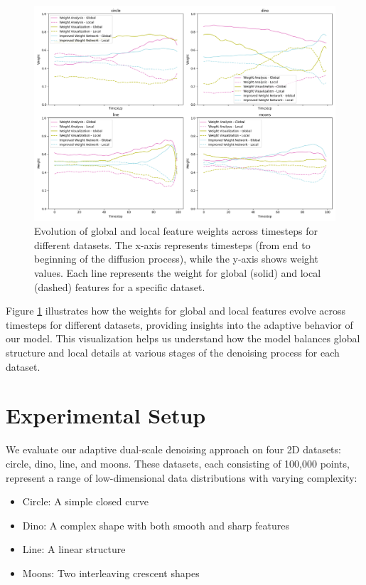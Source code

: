 \documentclass{article} %
\begin{document}
\begin{figure}[t]
    \centering
    \includegraphics[width=\textwidth]{weight_evolution.png}
    \caption{Evolution of global and local feature weights across timesteps for different datasets. The x-axis represents timesteps (from end to beginning of the diffusion process), while the y-axis shows weight values. Each line represents the weight for global (solid) and local (dashed) features for a specific dataset.}
    \label{fig:weight_evolution}
\end{figure}

Figure \ref{fig:weight_evolution} illustrates how the weights for global and local features evolve across timesteps for different datasets, providing insights into the adaptive behavior of our model. This visualization helps us understand how the model balances global structure and local details at various stages of the denoising process for each dataset.

\section{Experimental Setup}
\label{sec:experimental}

We evaluate our adaptive dual-scale denoising approach on four 2D datasets: circle, dino, line, and moons. These datasets, each consisting of 100,000 points, represent a range of low-dimensional data distributions with varying complexity:

\begin{itemize}
    \item Circle: A simple closed curve
    \item Dino: A complex shape with both smooth and sharp features
    \item Line: A linear structure
    \item Moons: Two interleaving crescent shapes
\end{itemize}
\end{document}
